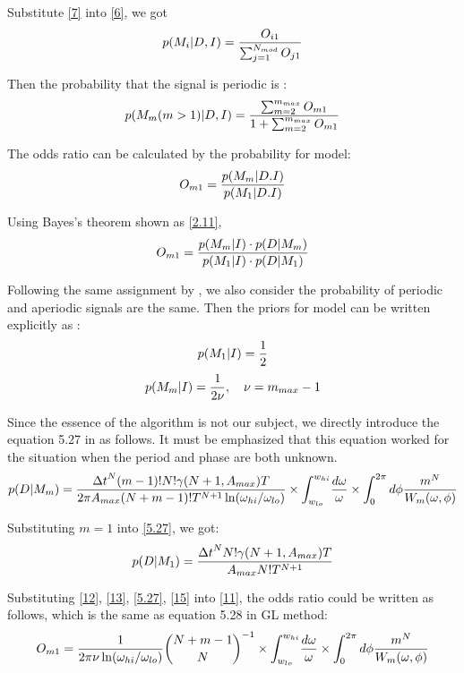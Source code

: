 \documentclass[twoside,twocolumn]{aastex63}
\begin{document}
Substitute \ref{7} into \ref{6}, we got
\begin{equation}\label{2.13}
p(M_i|D,I)={O_{i1}\over {\sum_{j=1}^{N_{mod}} O_{j1}}}
\end{equation}

Then the probability that the signal is periodic is :
\begin{equation}\label{5.2}
p(M_m(m>1)|D,I)={{\sum_{m=2}^{m_{max}} O_{m1}}\over {1+\sum_{m=2}^{m_{max}} O_{m1}}}
\end{equation}

The odds ratio can be calculated by the probability for model:
\begin{equation}
O_{m1}={{p(M_m|D.I)}\over {p(M_1|D.I)}}
\end{equation}

Using Bayes's theorem shown as \ref{2.11},
\begin{equation}\label{11}
O_{m1}={{p(M_m|I)\cdot p(D|M_m)}\over {p(M_1|I)\cdot p(D|M_1)}}
\end{equation}

Following the same assignment by \citep{1992ApJ...398..146G}, we also consider the probability of periodic and aperiodic signals are the same. Then the priors for model can be written explicitly as :
\begin{equation}\label{12}
p(M_1|I)={1\over 2}	
\end{equation}
\begin{equation}\label{13}
p(M_m|I)={1\over {2\nu}}	, \quad \nu =m_{max}-1
\end{equation}

Since the essence of the algorithm is not our subject, we directly introduce the equation 5.27 in \citep{1992ApJ...398..146G} as follows. It must be emphasized that this equation worked for the situation when the period and phase are both unknown. 
\begin{equation}\label{5.27}
p(D|M_m)={{{\Delta t}^N (m-1)! N! \gamma(N+1,A_{max})T}\over{2\pi A_{max} (N+m-1)!T^{N+1} \ln(\omega_{hi}/\omega_{lo})}}\times {\int_{w_{lo}}^{w_{hi}}}{{d\omega}\over{\omega}}\times {\int_0^{2\pi}d\phi{m^N\over W_m(\omega,\phi)}}	
\end{equation}

Substituting $m=1$ into \ref{5.27}, we got:
\begin{equation}\label{15}
p(D|M_1)={{{\Delta t}^N N!\gamma(N+1,A_{max})T}\over {A_{max}N!T^{N+1}}}
\end{equation}

Substituting \ref{12}, \ref{13}, \ref{5.27}, \ref{15} into \ref{11}, the odds ratio could be written as follows, which is the same as equation 5.28 in GL method:
\begin{equation}\label{A16}
O_{m1}={1\over{2\pi \nu \ln(\omega_{hi}/\omega_{lo})}} {{N+m-1}	\choose N}^{-1}\times {\int_{w_{lo}}^{w_{hi}}}{{d\omega}\over{\omega}}\times {\int_0^{2\pi}d\phi{m^N\over W_m(\omega,\phi)}} 
\end{equation}
\end{document}
